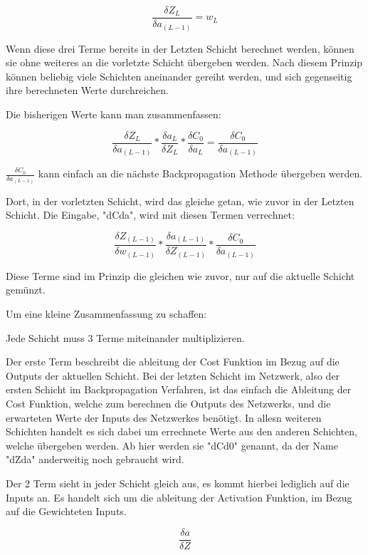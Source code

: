 \documentclass[12pt]{article}
\begin{document}
$$\frac{\delta Z_L}{\delta a_{(L-1)}} = w_L$$

Wenn diese drei Terme bereits in der Letzten Schicht berechnet werden, können sie ohne weiteres an die vorletzte Schicht übergeben werden. Nach diesem Prinzip können beliebig viele Schichten aneinander gereiht werden, und sich gegenseitig ihre berechneten Werte durchreichen. 

Die bisherigen Werte kann man zusammenfassen:

$$
\frac{\delta Z_L}{\delta a_{(L-1)}}*
\frac{\delta a_L}{\delta Z_L}*
\frac{\delta C_0}{\delta a_L}
= \frac{\delta C_0}{\delta a_{(L-1)}}
$$

$\frac{\delta C_0}{\delta a_{(L-1)}}$ kann einfach an die nächste Backpropagation Methode übergeben werden.

Dort, in der vorletzten Schicht, wird das gleiche getan, wie zuvor in der Letzten Schicht. Die Eingabe, "dCda", wird mit diesen Termen verrechnet:

$$
\frac{\delta Z_{(L-1)}}{\delta w_{(L-1)}}*
\frac{\delta a_{(L-1)}}{\delta Z_{(L-1)}}*
\frac{\delta C_0}{\delta a_{(L-1)}}
$$

Diese Terme sind im Prinzip die gleichen wie zuvor, nur auf die aktuelle Schicht gemünzt. 

Um eine kleine Zusammenfassung zu schaffen:

Jede Schicht muss 3 Terme miteinander multiplizieren. 

Der erste Term beschreibt die ableitung der Cost Funktion im Bezug auf die Outputs der aktuellen Schicht. Bei der letzten Schicht im Netzwerk, also der ersten Schicht im Backpropagation Verfahren, ist das einfach die Ableitung der Cost Funktion, welche zum berechnen die Outputs des Netzwerks, und die erwarteten Werte der Inputs des Netzwerkes benötigt. In allesn weiteren Schichten handelt es sich dabei um errechnete Werte aus den anderen Schichten, welche übergeben werden. Ab hier werden sie "dCd0" genannt, da der Name "dZda" anderweitig noch gebraucht wird.

Der 2 Term sieht in jeder Schicht gleich aus, es kommt hierbei lediglich auf die Inputs an. Es handelt sich um die ableitung der Activation Funktion, im Bezug auf die Gewichteten Inputs.

$$\frac{\delta a}{\delta Z}$$
\end{document}
